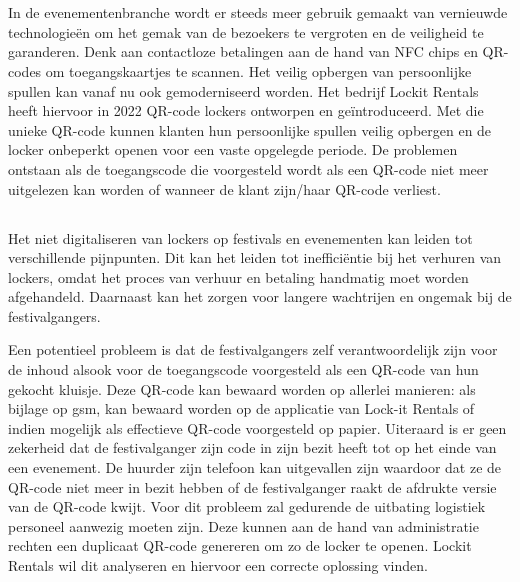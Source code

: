 
\chapter{}%
\label{ch:inleiding}

In de evenementenbranche wordt er steeds meer gebruik gemaakt van vernieuwde technologieën om het gemak van de bezoekers te vergroten en de veiligheid te garanderen. Denk aan contactloze betalingen aan de hand van NFC chips en QR-codes om toegangskaartjes te scannen. Het veilig opbergen van persoonlijke spullen kan vanaf nu ook gemoderniseerd worden. Het bedrijf Lockit Rentals heeft hiervoor in 2022 QR-code lockers ontworpen en geïntroduceerd. Met die unieke QR-code kunnen klanten hun persoonlijke spullen veilig opbergen en de locker onbeperkt openen voor een vaste opgelegde periode. De problemen ontstaan als de toegangscode die voorgesteld wordt als een QR-code niet meer uitgelezen kan worden of wanneer de klant zijn/haar QR-code verliest. 

\newpage

\section{}%
\label{sec:probleemstelling}

Het niet digitaliseren van lockers op festivals en evenementen kan leiden tot verschillende pijnpunten. Dit kan het leiden tot inefficiëntie bij het verhuren van lockers, omdat het proces van verhuur en betaling handmatig moet worden afgehandeld. Daarnaast kan het zorgen voor langere wachtrijen en ongemak bij de festivalgangers. 

Een potentieel probleem is dat de festivalgangers zelf verantwoordelijk zijn voor de inhoud alsook voor de toegangscode voorgesteld als een QR-code van hun gekocht kluisje. Deze QR-code kan bewaard worden op allerlei manieren: als bijlage op gsm, kan bewaard worden op de applicatie van Lock-it Rentals of indien mogelijk als effectieve QR-code voorgesteld op papier. Uiteraard is er geen zekerheid dat de festivalganger zijn code in zijn bezit heeft tot op het einde van een evenement. De huurder zijn telefoon kan uitgevallen zijn waardoor dat ze de QR-code niet meer in bezit hebben of de festivalganger raakt de afdrukte versie van de QR-code kwijt. Voor dit probleem zal gedurende de uitbating logistiek personeel aanwezig moeten zijn. Deze kunnen aan de hand van administratie rechten een duplicaat QR-code genereren om zo de locker te openen. Lockit Rentals wil dit analyseren en hiervoor een correcte oplossing vinden. 

